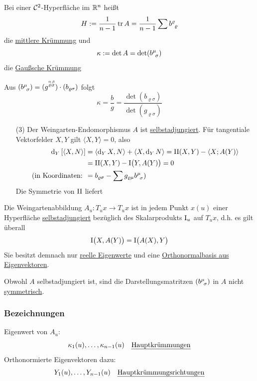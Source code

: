 \begin{definition}
 Bei einer \(\mathcal{C}^2\)-Hyperfläche im \(\mathbb{R}^n\) heißt 
 \[
  H:= \frac{1}{n-1} \operatorname{tr} A = \frac{1}{n-1} \sum b^{\varrho}_{\;\,\varrho}
 \]
 die \uline{mittlere Krümmung} und
 \[
  \kappa := \det A = \det (b^{\mu}_{\;\,\sigma})
 \]
 die \uline{Gaußsche Krümmung}
\end{definition}

\begin{bemerkung}
 Aus \((b^{\mu}_{\;\,\sigma} ) = (g^{\stackrel{\alpha}{\varrho}\stackrel{\beta}{\sigma}}) \cdot (b_{\varrho \sigma})\) folgt 
 \[
  \kappa = \frac{b}{g} = \frac{\det (b_{\varrho \sigma})}{\det (g_{\varrho \sigma})}
 \]
\end{bemerkung}

\begin{enumerate}
 \item[(3)] Der Weingarten-Endomorphismus \(A\) ist \uline{selbstadjungiert}. Für tangentiale Vektorfelder \(X,Y\) gilt \(\langle X, Y\rangle = 0\), also 
 \begin{align*}
  \dd_Y \left[ \langle X,N \rangle \right] &= \langle \dd_Y X, N \rangle + \langle X, \dd_Y N \rangle = \Rom 2 (X,Y) - \langle X;A(Y) \rangle \\
  &=\Rom 2 (X,Y) - \Rom 1\big(Y, A(Y)\big) = 0 \\
  (\text{in Koordinaten: } &= b_{\varrho \sigma} - \sum g_{\varrho \mu} \wein \mu \sigma )
  \end{align*}
  Die Symmetrie von \(\Rom 2\) liefert
\end{enumerate}

\begin{satz}\label{satz216}
 Die Weingartenabbildung \(A_u \colon T_u x \to T_u x\) ist in jedem Punkt \(x(u)\) einer Hyperfläche \uline{selbstadjungiert} bezüglich des Skalarprodukts \(\Rom 1_u\) auf \(T_u x\), d.h. es gilt überall
 \[
  \Rom 1 \big(X, A(Y)\big) = \Rom 1 \big(A(X), Y\big)
 \]
 Sie besitzt demnach nur \uline{reelle Eigenwerte} und eine \uline{Orthonormalbasis aus Eigenvektoren}.
\end{satz}

\begin{bemerkung}
 Obwohl \(A\) selbstadjungiert ist, sind die Darstellungsmatritzen \((b^{\mu}_{\;\,\sigma})\) in \(A\) nicht \uline{symmetrisch}.
\end{bemerkung}

\subsubsection{Bezeichnungen}
Eigenwert von \(A_u\):
\[
 \kappa_1(u), \dots, \kappa_{n-1}(u) \quad \text{\uline{Hauptkrümmungen}}
\]
Orthonormierte Eigenvektoren dazu:
\[
 Y_1(u), \dots, Y_{n-1}(u) \quad \text{\uline{Hauptkrümmungsrichtungen}}
\]

